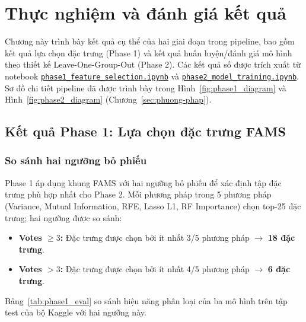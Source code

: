 \section{Thực nghiệm và đánh giá kết quả}
\label{sec:thuc-nghiem}

Chương này trình bày kết quả cụ thể của hai giai đoạn trong pipeline, bao gồm kết quả lựa chọn đặc trưng (Phase 1) và kết quả huấn luyện/đánh giá mô hình theo thiết kế Leave-One-Group-Out (Phase 2). Các kết quả số được trích xuất từ notebook \href{https://github.com/hoainn/HocMayATTT/blob/main/phase1\_feature\_selection.ipynb}{\texttt{phase1\_feature\_selection.ipynb}} và \href{https://github.com/hoainn/HocMayATTT/blob/main/phase2\_model\_training.ipynb}{\texttt{phase2\_model\_training.ipynb}}. Sơ đồ chi tiết pipeline đã được trình bày trong Hình~\ref{fig:phase1_diagram} và Hình~\ref{fig:phase2_diagram} (Chương~\ref{sec:phuong-phap}).

\subsection{Kết quả Phase 1: Lựa chọn đặc trưng FAMS}

\subsubsection{So sánh hai ngưỡng bỏ phiếu}

Phase 1 áp dụng khung FAMS với hai ngưỡng bỏ phiếu để xác định tập đặc trưng phù hợp nhất cho Phase 2. Mỗi phương pháp trong 5 phương pháp (Variance, Mutual Information, RFE, Lasso L1, RF Importance) chọn top-25 đặc trưng; hai ngưỡng được so sánh:

\begin{itemize}
    \item \textbf{Votes $\geq 3$:} Đặc trưng được chọn bởi ít nhất 3/5 phương pháp $\to$ \textbf{18 đặc trưng}.
    \item \textbf{Votes $> 3$:} Đặc trưng được chọn bởi ít nhất 4/5 phương pháp $\to$ \textbf{6 đặc trưng}.
\end{itemize}

Bảng~\ref{tab:phase1_eval} so sánh hiệu năng phân loại của ba mô hình trên tập test của bộ Kaggle với hai ngưỡng này.

